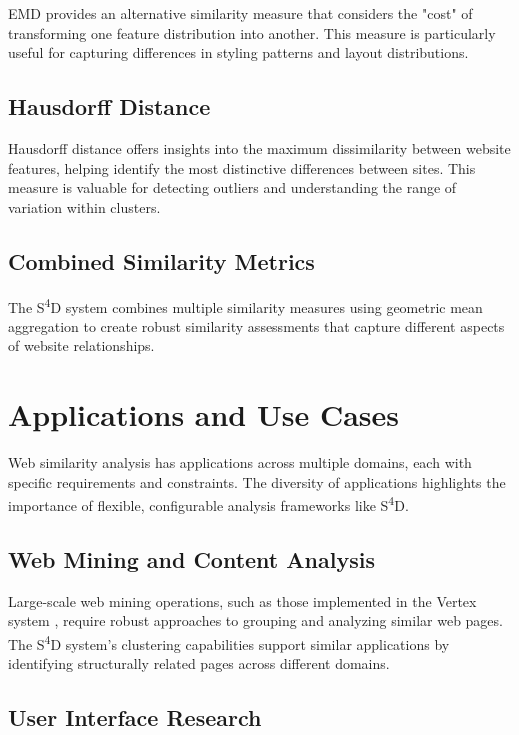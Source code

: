 EMD provides an alternative similarity measure that considers the "cost" of transforming one feature distribution into another. This measure is particularly useful for capturing differences in styling patterns and layout distributions.

\subsection{Hausdorff Distance}

Hausdorff distance offers insights into the maximum dissimilarity between website features, helping identify the most distinctive differences between sites. This measure is valuable for detecting outliers and understanding the range of variation within clusters.

\subsection{Combined Similarity Metrics}

The S\textsuperscript{4}D system combines multiple similarity measures using geometric mean aggregation to create robust similarity assessments that capture different aspects of website relationships.



\section{Applications and Use Cases}
\label{sec:applications}

Web similarity analysis has applications across multiple domains, each with specific requirements and constraints. The diversity of applications highlights the importance of flexible, configurable analysis frameworks like S\textsuperscript{4}D.

\subsection{Web Mining and Content Analysis}

Large-scale web mining operations, such as those implemented in the Vertex system \cite{gulhane2011vertex}, require robust approaches to grouping and analyzing similar web pages. The S\textsuperscript{4}D system's clustering capabilities support similar applications by identifying structurally related pages across different domains.

\subsection{User Interface Research}

